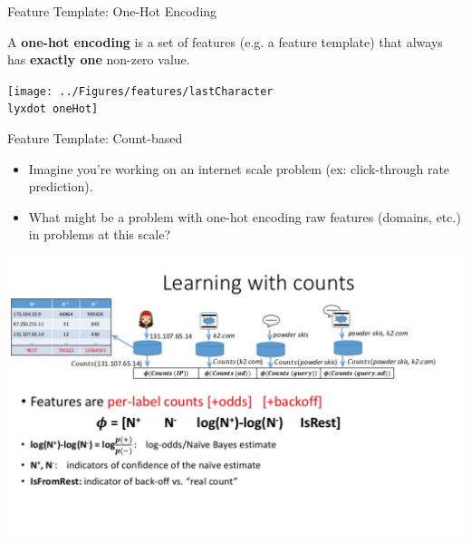 
\begin{frame}{Feature Template: One-Hot Encoding}
\begin{definition}
A \textbf{one-hot encoding }is a set of features (e.g. a feature template)
that always has \textbf{exactly one} non-zero value. 

\pause{}
\end{definition}

\begin{center}
\texttt{[image: ../Figures/features/lastCharacter\\lyxdot oneHot]} 
\par\end{center}
\let\thefootnote\relax{}
\end{frame}


\begin{frame}{Feature Template: Count-based}
\begin{itemize}
	\item Imagine you're working on an internet scale problem (ex:  click-through rate prediction).
	\item What might be a problem with one-hot encoding raw features (domains, etc.) in problems at this scale?
\end{itemize}
\end{frame}


\begin{frame}
\begin{center}
\includegraphics[height=0.9\textheight]{../Figures/learn_with_counts.png} 
\par\end{center}
\let\thefootnote\relax{}
\end{frame}
